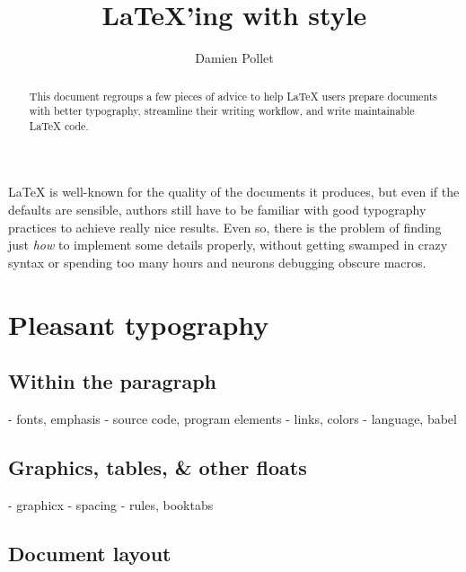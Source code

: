 \documentclass[a4paper,twoside,nofonts]{tufte-handout}
\title{\LaTeX'ing with style}
\author{Damien Pollet}
\date{}
\begin{document}
\maketitle

\begin{abstract}
    This document regroups a few pieces of advice to help \LaTeX{} users prepare documents with better typography, streamline their writing workflow, and write maintainable \LaTeX{} code.
\end{abstract}



\noindent
    \LaTeX{} is well-known for the quality of the documents it produces, but even if the defaults are sensible, authors still have to be familiar with good typography practices to achieve really nice results.
Even so, there is the problem of finding just \emph{how} to implement some details properly, without getting swamped in crazy syntax or spending too many hours and neurons debugging obscure macros. 



\section{Pleasant typography} %
\label{sec:typography}

\subsection{Within the paragraph} %
\label{sub:paragraph}

\begin{todoenv}
    - fonts, emphasis
    - source code, program elements
    - links, colors
    - language, babel
\end{todoenv}

\subsection{Graphics, tables, \& other floats} %
\label{sub:graphics}

\begin{todoenv}
    - graphicx
    - spacing
    - rules, booktabs
\end{todoenv}

\subsection{Document layout} %
\label{sub:layout}
\end{document}
